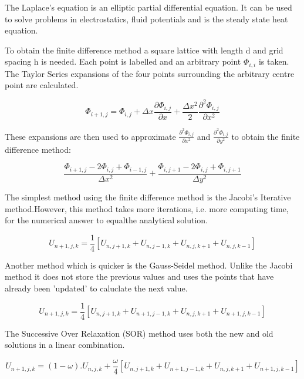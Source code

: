 \documentclass{article}
\begin{document}
The Laplace's equation is an elliptic partial differential equation. It can be used to solve problems in electrostatics, fluid potentials and is the steady state heat equation.

To obtain the finite difference method a square lattice with length d and grid spacing h is needed. Each point is labelled and an arbitrary point $\Phi_{i,i}$ is taken. The Taylor Series expansions of the four points surrounding the arbitrary centre point are calculated.

\begin{equation} \Phi_{i+1,j} = \Phi_{i,j} + \Delta x \frac{\partial \Phi_{i,j}}{\partial x } + \frac{\Delta x^{2}}{2}\frac{\partial^{2}\Phi_{i,j}}{\partial x^{2}}
\end{equation}

These expansions are then used to approximate $\frac{\partial^{2}\Phi_{i,j}}{\partial x^{2}}$ and $\frac{\partial^{2}\Phi_{i,j}}{\partial y^{2}}$ to obtain the finite difference method:

\begin{equation} \frac{\Phi_{i+1,j}-2\Phi_{i,j}+\Phi_{i-1,j} }{\Delta x^{2}}+\frac{\Phi_{i,j+1}-2\Phi_{i,j}+\Phi_{i,j+1} }{\Delta y^{2}} \end{equation}


The simplest method using the finite difference method is the Jacobi's Iterative method.However, this method takes more iterations, i.e. more computing time, for the numerical answer to equalthe analytical solution.


\begin{equation} U_{n+1,j,k}=\frac{1}{4}\left[ U_{n,j+1,k} + U_{n,j-1,k} + U_{n,j,k+1} +U_{n,j,k-1}\right]
\end{equation}

Another method which is quicker is the Gauss-Seidel method. Unlike the Jacobi method it does not store the previous values and uses the points that have already been 'updated' to caluclate the next value.

\begin{equation} 
U_{n+1,j,k}=\frac{1}{4}\left[ U_{n,j+1,k} + U_{n+1,j-1,k} + U_{n,j,k+1} +U_{n+1,j,k-1}\right]
\end{equation}

The Successive Over Relaxation (SOR) method uses both the new and old solutions in a linear combination.

\begin{equation} 
U_{n+1,j,k}=\left(1-\omega\right). U_{n,j,k}+\frac{\omega}{4}\left [ U_{n,j+1,k} + U_{n+1,j-1,k} + U_{n,j,k+1} +U_{n+1,j,k-1}\right]
\end{equation}
\end{document}
